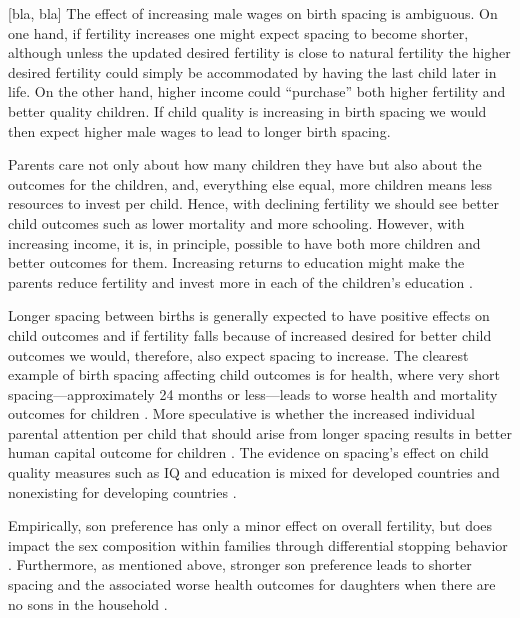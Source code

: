 [bla, bla]
The effect of increasing male wages on birth spacing is ambiguous.
On one hand, if fertility increases one might expect spacing to become shorter, although 
unless the updated desired fertility is close to natural fertility the higher desired 
fertility could simply be accommodated by having the last child later in life.
On the other hand, higher income could ``purchase'' both higher fertility and 
better quality children.
If child quality is increasing in birth spacing we would then expect higher male wages
to lead to longer birth spacing.


Parents care not only about how many children they have but also about the outcomes
for the children, and, everything else equal, more children means less resources to invest 
per child.
Hence, with declining fertility we should see better child outcomes such as lower 
mortality and more schooling.
However, with increasing income, it is, in principle, possible to have both more
children and better outcomes for them.
Increasing returns to education might make the parents reduce fertility and invest 
more in each of the children's education \citep{Rosenzweig1982a}.

Longer spacing between births is generally expected to have positive effects on 
child outcomes and if fertility falls because of increased desired for better child
outcomes we would, therefore, also expect spacing to increase.
The clearest example of birth spacing affecting child outcomes is for health,
where very short spacing---approximately 24 months or less---leads to worse health 
and mortality outcomes for children 
\citep{Whitworth2002,Conde-Agudelo2006,Conde-Agudelo2012,Molitoris2019}.
More speculative is whether the increased individual parental attention per child that 
should arise from longer spacing results in better human capital outcome for children 
\citep{Zajonc1975,Zajonc1976,Razin1980}.
The evidence on spacing's effect on child quality measures such as IQ and education is 
mixed for developed countries and nonexisting for developing countries
\citep{Powell1993,Pettersson-Lidbom2009,Buckles2012,Barclay2017}.


Empirically, son preference has only a minor effect on overall fertility, but does impact 
the sex composition within families through differential stopping behavior 
\citet{repetto72,leung94,clark00,Basu2010,Barcellos2014}. 
Furthermore, as mentioned above, stronger son preference leads to shorter spacing and the 
associated worse health outcomes for daughters when there are no sons in the household 
\citep{Whitworth2002,Bhalotra2008,Maitra2008,Jayachandran2011,Jayachandran2017a}.

